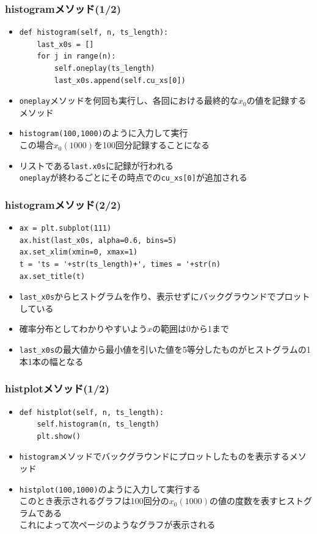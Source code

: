 \documentclass[dvipdfmx,fleqn]{beamer}
\begin{document}
\begin{frame}[fragile]%
\frametitle{histogramメソッド(1/2)}
\begin{itemize}\setlength{\parskip}{0.5em}
\item
\footnotesize
\begin{verbatim}
def histogram(self, n, ts_length):
    last_x0s = []
    for j in range(n):
        self.oneplay(ts_length)
        last_x0s.append(self.cu_xs[0])
\end{verbatim}\pause
\normalsize
\item
\verb|oneplay|メソッドを何回も実行し、各回における最終的な$x_0$の値を記録するメソッド
\pause
\item
\verb|histogram(100,1000)|のように入力して実行\pause\\
この場合$x_0(1000)$を100回分記録することになる
\pause
\item
リストである\verb|last.x0s|に記録が行われる\pause\\
\verb|oneplay|が終わるごとにその時点での\verb|cu_xs[0]|が追加される
\end{itemize}
\end{frame}


\begin{frame}[fragile]%
\frametitle{histogramメソッド(2/2)}
\begin{itemize}\setlength{\parskip}{0.5em}
\item
\footnotesize
\begin{verbatim}
ax = plt.subplot(111)
ax.hist(last_x0s, alpha=0.6, bins=5)
ax.set_xlim(xmin=0, xmax=1)
t = 'ts = '+str(ts_length)+', times = '+str(n)
ax.set_title(t)
\end{verbatim}\pause
\normalsize
\pause
\item
\verb|last_x0s|からヒストグラムを作り、表示せずにバックグラウンドでプロットしている
\pause
\item
確率分布としてわかりやすいよう$x$の範囲は0から1まで
\item
\verb|last_x0s|の最大値から最小値を引いた値を5等分したものがヒストグラムの1本1本の幅となる
\end{itemize}
\end{frame}


\begin{frame}[fragile]%
\frametitle{histplotメソッド(1/2)}
\begin{itemize}\setlength{\parskip}{0.5em}
\item
\footnotesize
\begin{verbatim}
def histplot(self, n, ts_length):
    self.histogram(n, ts_length)
    plt.show()
\end{verbatim}
\normalsize
\pause
\item
\verb|histogram|メソッドでバックグラウンドにプロットしたものを表示するメソッド
\item
\verb|histplot(100,1000)|のように入力して実行する\pause\\
このとき表示されるグラフは100回分の$x_0(1000)$の値の度数を表すヒストグラムである
\pause
\\
これによって次ページのようなグラフが表示される
\end{itemize}
\end{frame}
\end{document}
